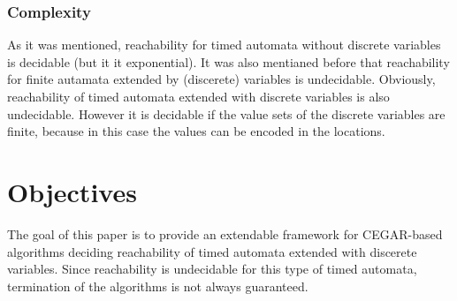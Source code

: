 \subsubsection{Complexity}

As it was mentioned, reachability for timed automata without discrete variables is decidable (but it it exponential). It was also mentianed before that reachability for finite autamata extended by (discerete) variables is undecidable. Obviously, reachability of timed automata extended with discrete variables is also undecidable. However it is decidable if the value sets of the discrete variables are finite, because in this case the values can be encoded in the locations. 

\section{Objectives}

The goal of this paper is to provide an extendable framework for CEGAR-based algorithms deciding reachability of timed automata extended with discerete variables. Since reachability is undecidable for this type of timed automata, termination of the algorithms is not always guaranteed.




